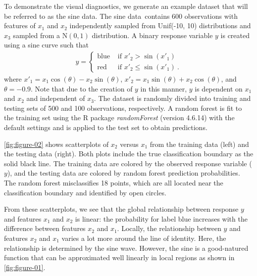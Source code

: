 \documentclass[AMS,STIX2COL]{WileyNJD-v2}\usepackage[]{graphicx}\usepackage[]{color}
\newcommand{\data}{sine data}
\begin{document}
To demonstrate the visual diagnostics, we generate an example dataset that will be referred to as the \data. The \data \ contains 600 observations with  features of $x_1$ and $x_2$ independently sampled from Unif(-10, 10) distributions and $x_3$ sampled from a $\mbox{N}(0,1)$ distribution. A binary response variable $y$ is created using a sine curve such that
\begin{eqnarray}\label{eq:data}
  y=\begin{cases}
  \mbox{blue} & \mbox{ if } x'_2 > \sin\left(x'_1\right) \\
  \mbox{red} & \mbox{ if } x'_2 \le \sin\left(x'_1\right) \ .
  \end{cases}
\end{eqnarray}
where $x'_1=x_1\cos(\theta)-x_2\sin(\theta)$,  $x'_2=x_1\sin(\theta)+x_2\cos(\theta)$, and  $\theta=-0.9$. Note that due to the creation of $y$ in this manner, $y$ is dependent on $x_1$ and $x_2$ and independent of $x_3$. The dataset is randomly divided into training and testing sets of 500 and 100 observations, respectively. A random forest is fit to the training set using the R package \emph{randomForest} (version 4.6.14) \citep{liaw:2002} with the default settings and is applied to the test set to obtain predictions. 

\autoref{fig:figure-02} shows scatterplots of $x_2$ versus $x_1$ from the training data (left) and the testing data (right). Both plots include the true classification boundary as the solid black line. The training data are colored by the observed response variable ($y$), and the testing data are colored by random forest prediction probabilities. The random forest misclassifies 18 points, which are all located near the classification boundary and identified by open circles. 

From these scatterplots, we  see that the global relationship between response $y$ and features $x_1$ and $x_2$ is linear: the probability for label blue increases with the difference between features $x_2$ and $x_1$. Locally, the relationship between $y$ and features $x_2$ and $x_1$ varies a lot more around the line of identity. Here, the relationship is determined by the sine wave. However, the sine is a good-natured function that can be approximated well linearly in local regions as shown in \autoref{fig:figure-01}.
\end{document}
